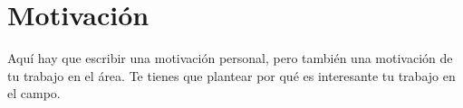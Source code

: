 \section{Motivación}\label{section:motivacion}

Aquí hay que escribir una motivación personal, pero también una motivación de tu trabajo en el área. Te tienes que plantear por qué es interesante tu trabajo en el campo.